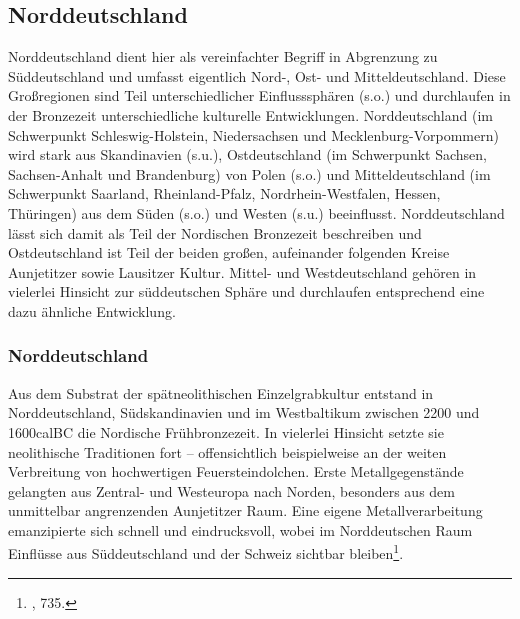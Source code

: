 \documentclass[openany,twoside,twocolumn]{book}
\let\rmarkdownfootnote\footnote%
\def\footnote{\protect\rmarkdownfootnote}
\begin{document}
\autocites{falkenstein_development_2012}{falkenstein_zum_2017}

\hypertarget{norddeutschland}{%
\subsection{Norddeutschland}\label{norddeutschland}}

Norddeutschland dient hier als vereinfachter Begriff in Abgrenzung zu
Süddeutschland und umfasst eigentlich Nord-, Ost- und Mitteldeutschland.
Diese Großregionen sind Teil unterschiedlicher Einflusssphären (s.o.)
und durchlaufen in der Bronzezeit unterschiedliche kulturelle
Entwicklungen. Norddeutschland (im Schwerpunkt Schleswig-Holstein,
Niedersachsen und Mecklenburg-Vorpommern) wird stark aus Skandinavien
(s.u.), Ostdeutschland (im Schwerpunkt Sachsen, Sachsen-Anhalt und
Brandenburg) von Polen (s.o.) und Mitteldeutschland (im Schwerpunkt
Saarland, Rheinland-Pfalz, Nordrhein-Westfalen, Hessen, Thüringen) aus
dem Süden (s.o.) und Westen (s.u.) beeinflusst. Norddeutschland lässt
sich damit als Teil der Nordischen Bronzezeit beschreiben und
Ostdeutschland ist Teil der beiden großen, aufeinander folgenden Kreise
Aunjetitzer sowie Lausitzer Kultur. Mittel- und Westdeutschland gehören
in vielerlei Hinsicht zur süddeutschen Sphäre und durchlaufen
entsprechend eine dazu ähnliche Entwicklung.

\hypertarget{norddeutschland-1}{%
\subsubsection{Norddeutschland}\label{norddeutschland-1}}

Aus dem Substrat der spätneolithischen Einzelgrabkultur entstand in
Norddeutschland, Südskandinavien und im Westbaltikum zwischen 2200 und
1600calBC die Nordische Frühbronzezeit. In vielerlei Hinsicht setzte sie
neolithische Traditionen fort -- offensichtlich beispielweise an der
weiten Verbreitung von hochwertigen Feuersteindolchen. Erste
Metallgegenstände gelangten aus Zentral- und Westeuropa nach Norden,
besonders aus dem unmittelbar angrenzenden Aunjetitzer Raum. Eine eigene
Metallverarbeitung emanzipierte sich schnell und eindrucksvoll, wobei im
Norddeutschen Raum Einflüsse aus Süddeutschland und der Schweiz sichtbar
bleiben\footnote{\textcite{jockenhovel_germany_2013}, 735.}.
\end{document}
